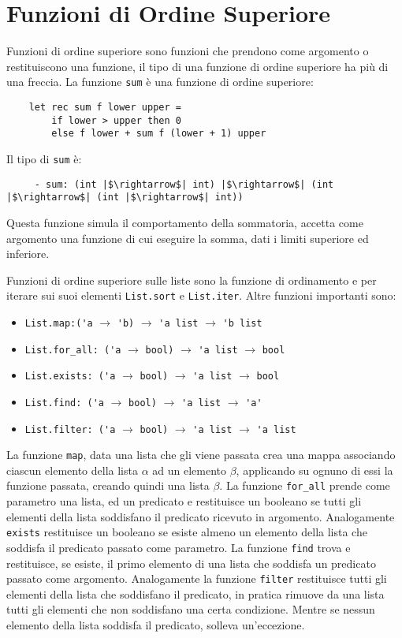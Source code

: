 \documentclass{article}
\numberwithin{equation}{subsection}
\begin{document}
\clearpage

\section{Funzioni di Ordine Superiore}

Funzioni di ordine superiore sono funzioni che prendono come argomento o restituiscono una funzione, il tipo di una funzione di ordine superiore ha più di una freccia. La funzione \verb|sum| è una funzione di ordine superiore:
\begin{verbatim}
    let rec sum f lower upper =
        if lower > upper then 0
        else f lower + sum f (lower + 1) upper
\end{verbatim}
Il tipo di \verb|sum| è:
\begin{verbatim}
     - sum: (int |$\rightarrow$| int) |$\rightarrow$| (int |$\rightarrow$| (int |$\rightarrow$| int)) 
\end{verbatim}
Questa funzione simula il comportamento della sommatoria, accetta come argomento una funzione di cui eseguire la somma, dati i limiti superiore ed inferiore. 

Funzioni di ordine superiore sulle liste sono la funzione di ordinamento e per iterare sui suoi elementi \verb|List.sort| e \verb|List.iter|. 
Altre funzioni importanti sono:
\begin{itemize}
    \item \verb|List.map:('a| $\rightarrow$ \verb|'b)| $\rightarrow$ \verb|'a list| $\rightarrow$ \verb|'b list|
    \item \verb|List.for_all: ('a| $\rightarrow$ \verb|bool)| $\rightarrow$ \verb|'a list| $\rightarrow$ \verb|bool|
    \item \verb|List.exists: ('a| $\rightarrow$ \verb|bool)| $\rightarrow$ \verb|'a list| $\rightarrow$ \verb|bool|
    \item \verb|List.find: ('a| $\rightarrow$ \verb|bool)| $\rightarrow$ \verb|'a list| $\rightarrow$ \verb|'a'|
    \item \verb|List.filter: ('a| $\rightarrow$ \verb|bool)| $\rightarrow$ \verb|'a list| $\rightarrow$ \verb|'a list|
\end{itemize}

La funzione \verb|map|, data una lista che gli viene passata crea una mappa associando ciascun elemento della lista $\alpha$ ad un elemento $\beta$, applicando su ognuno di essi la funzione passata, creando quindi una lista $\beta$. 
La funzione \verb|for_all| prende come parametro una lista, ed un predicato e restituisce un booleano se tutti gli elementi della lista soddisfano il predicato ricevuto in argomento. 
Analogamente \verb|exists| restituisce un booleano se esiste almeno un elemento della lista che soddisfa il predicato passato come parametro. 
La funzione \verb|find| trova e restituisce, se esiste, il primo elemento di una lista che soddisfa un predicato passato come argomento. 
Analogamente la funzione \verb|filter| restituisce tutti gli elementi della lista che soddisfano il predicato, in pratica rimuove da una lista tutti gli elementi che non soddisfano una certa condizione. Mentre se nessun elemento della lista soddisfa il predicato, solleva un'eccezione. 
\end{document}
